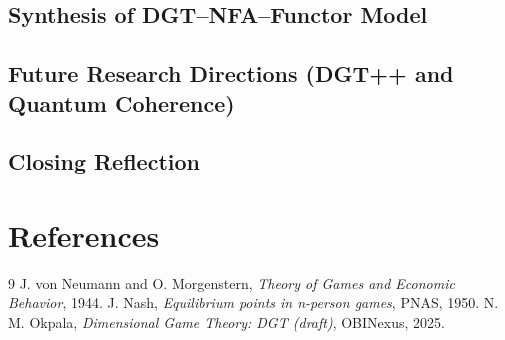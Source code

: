 \documentclass[12pt,a4paper]{article}
\begin{document}
\subsection{Synthesis of DGT--NFA--Functor Model}
\subsection{Future Research Directions (DGT++ and Quantum Coherence)}
\subsection{Closing Reflection}

\section*{References}
\begin{thebibliography}{9}
 J. von Neumann and O. Morgenstern, \emph{Theory of Games and Economic Behavior}, 1944.
 J. Nash, \emph{Equilibrium points in n-person games}, PNAS, 1950.
 N. M. Okpala, \emph{Dimensional Game Theory: DGT (draft)}, OBINexus, 2025.
\end{thebibliography}
\end{document}
